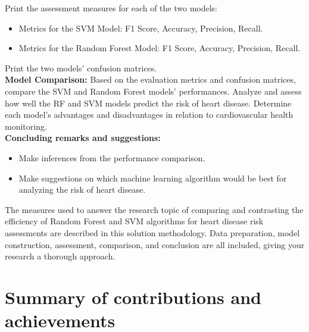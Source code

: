 Print the assessment measures for each of the two models:
\begin{itemize}
    \item Metrics for the SVM Model: F1 Score, Accuracy, Precision, Recall.
    \item Metrics for the Random Forest Model: F1 Score, Accuracy, Precision, Recall.
\end{itemize}

Print the two models' confusion matrices.
\\
\textbf{Model Comparison:} Based on the evaluation metrics and confusion matrices, compare the SVM and Random Forest models' performances. Analyze and assess how well the RF and SVM models predict the risk of heart disease. Determine each model's advantages and disadvantages in relation to cardiovascular health monitoring.
\\
\textbf{Concluding remarks and suggestions:}
\begin{itemize}
    \item Make inferences from the performance comparison.
    \item Make suggestions on which machine learning algorithm would be best for analyzing the risk of heart disease.
\end{itemize}

The measures used to answer the research topic of comparing and contrasting the efficiency of Random Forest and SVM algorithms for heart disease risk assessments are described in this solution methodology. Data preparation, model construction, assessment, comparison, and conclusion are all included, giving your research a thorough approach.



\section{Summary of contributions and achievements} 



